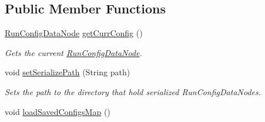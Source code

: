 \subsection*{Public Member Functions}
\begin{DoxyCompactItemize}
\item 
\hyperlink{classedu_1_1udel_1_1cis_1_1vsl_1_1civl_1_1gui_1_1common_1_1RunConfigDataNode}{Run\+Config\+Data\+Node} \hyperlink{classedu_1_1udel_1_1cis_1_1vsl_1_1civl_1_1gui_1_1common_1_1GUI__revamp_ab3a38950d7c91daca0b2dd973b961eb0}{get\+Curr\+Config} ()
\begin{DoxyCompactList}\small\item\em Gets the current \hyperlink{classedu_1_1udel_1_1cis_1_1vsl_1_1civl_1_1gui_1_1common_1_1RunConfigDataNode}{Run\+Config\+Data\+Node}. \end{DoxyCompactList}\item 
void \hyperlink{classedu_1_1udel_1_1cis_1_1vsl_1_1civl_1_1gui_1_1common_1_1GUI__revamp_a8d6848d4ca68df96dc3a4f5c44214533}{set\+Serialize\+Path} (String path)
\begin{DoxyCompactList}\small\item\em Sets the path to the directory that hold serialized Run\+Config\+Data\+Nodes. \end{DoxyCompactList}\item 
\hypertarget{classedu_1_1udel_1_1cis_1_1vsl_1_1civl_1_1gui_1_1common_1_1GUI__revamp_a9f7c1725920265026c81fef73e288a5f}{}void \hyperlink{classedu_1_1udel_1_1cis_1_1vsl_1_1civl_1_1gui_1_1common_1_1GUI__revamp_a9f7c1725920265026c81fef73e288a5f}{load\+Saved\+Configs\+Map} ()\label{classedu_1_1udel_1_1cis_1_1vsl_1_1civl_1_1gui_1_1common_1_1GUI__revamp_a9f7c1725920265026c81fef73e288a5f}


\end{DoxyCompactItemize}
